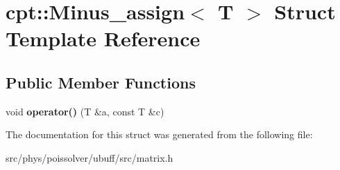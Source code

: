 \hypertarget{structcpt_1_1Minus__assign}{}\section{cpt\+:\+:Minus\+\_\+assign$<$ T $>$ Struct Template Reference}
\label{structcpt_1_1Minus__assign}
\subsection*{Public Member Functions}
\begin{DoxyCompactItemize}
\item 
void {\bfseries operator()} (T \&a, const T \&c)\hypertarget{structcpt_1_1Minus__assign_af48c54146527c8dc8756f024815da7dd}{}\label{structcpt_1_1Minus__assign_af48c54146527c8dc8756f024815da7dd}

\end{DoxyCompactItemize}


The documentation for this struct was generated from the following file\+:\begin{DoxyCompactItemize}
\item 
src/phys/poissolver/ubuff/src/matrix.\+h\end{DoxyCompactItemize}
